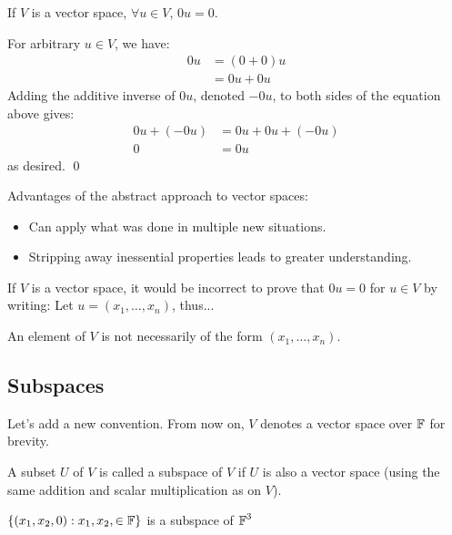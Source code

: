 \begin{theorem}
    If $V$ is a vector space, $\forall u \in V$, $0u = 0$.
    \begin{proof*}
    For arbitrary $u \in V$, we have:
    \begin{align*}
        0u &= (0 + 0)u \\
        &= 0u + 0u
    \end{align*}
    Adding the additive inverse of $0u$, denoted $-0u$, to both sides of the equation
    above gives:
    \begin{align*}
        0u + (-0u) &= 0u + 0u + (-0u) \\
        0 &= 0u
    \end{align*}
    as desired. \qed
    \end{proof*}

\end{theorem}

Advantages of the abstract approach to vector spaces:
\begin{itemize}
    \item Can apply what was done in multiple new situations.
    \item Stripping away inessential properties leads to greater understanding.
\end{itemize}

If $V$ is a vector space, it would be incorrect to prove that $0u = 0$ for $u \in V$
by writing: Let $u = (x_1, \ldots, x_n)$, thus...

\begin{note}
    An element of $V$ is not necessarily of the form $(x_1, \ldots, x_n)$.
\end{note}

\subsection{Subspaces}

Let's add a new convention. From now on, $V$ denotes a vector space over $\operatorname{\mathbb{F}}$
for brevity.

\begin{definition}[Subspace]
    A subset $U$ of $V$ is called a subspace of $V$ if $U$ is also a vector space
    (using the same addition and scalar multiplication as on $V$).
\end{definition}

\begin{example}
    $\{(x_1, x_2, 0) : x_1, x_2, \in \operatorname{\mathbb{F}} \}$ is a subspace of $\operatorname{\mathbb{F}}^3$
\end{example}

